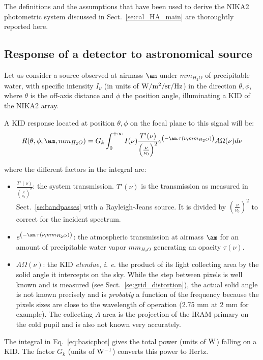 

The definitions and the assumptions that have been used to derive the
NIKA2 photometric system discussed in Sect.~\ref{se:cal_HA_main} are
thoroughtly reported here.


\subsection{Response of a detector to astronomical source}


Let us consider a source observed at airmass $\am$ under
$mm_{H_{2}O}$ of precipitable water, with specific intensity $I_{\nu}$ (in units
of  ${\rm W/m^{2}/sr/Hz}$) in the direction $\theta, \phi$, where $\theta$
is the off-axis distance and $\phi$ the position angle, illuminating a KID
of the NIKA2 array. 

A KID response located at position $\theta, \phi$
on the focal plane to this signal will be:
\begin{equation}
R(\theta, \phi, \am, mm_{H_{2}O}) = G_{k} \int_{0}^{+\infty} I(\nu)
\frac{T'(\nu)}{\left(\frac{\nu}{\nu_{0}}\right)^{2}} e^{\left(-\am
  . \tau(\nu,  mm_{H_{2}O})\right)}A\Omega (\nu)  d\nu 
\label{eq:basicphot}
\end{equation}


where the different factors in the integral are:
\begin{itemize}
\item $\frac{T'(\nu)}{\left(\frac{\nu}{\nu_{0}}\right)^{2}}$:  the
  system transmission. $T'(\nu)$ is the transmission as measured in
  Sect.~\ref{se:bandpasses} with a Rayleigh-Jeans source. It is
  divided by $\left(\frac{\nu}{\nu_{0}}\right)^{2}$ to correct for the
  incident spectrum.

\item $e^{\left(-\am . \tau(\nu,  mm_{H_{2}O} )\right)}$: the
  atmospheric transmission at airmass  $\am$ for an amount of
  precipitable water vapor $mm_{H_{2}O}$ generating an opacity $\tau(\nu)$.
\item $A\Omega (\nu) $: the KID \emph{etendue}, {\it i. e.} the product of
  its light collecting area by the solid angle it intercepts on the
  sky. While the step between pixels is well known and is measured
  (see Sect.~\ref{se:grid_distortion}), the
  actual solid angle is not known precisely and is {\em probably} a function of the
  frequency  because the pixels sizes are close to the wavelength of
  operation (2.75 mm at 2 mm for example). The collecting $A$ area is the
  projection of the IRAM primary on the cold pupil and is also not
  known very accurately.
\end{itemize}
The integral in Eq.~\ref{eq:basicphot} gives the total power (units of $\rm W$)
falling on a KID. The factor $G_{k}$ (units of  $\rm W^{-1}$) converts this
power to Hertz.%

